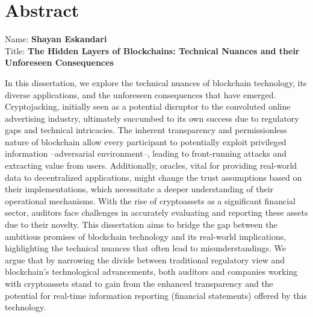 
\chapter*{Abstract}

Name: 	\tab \textbf{Shayan Eskandari} \\
Title: 	\tab \textbf{The Hidden Layers of Blockchains: Technical Nuances and their Unforeseen Consequences}

In this dissertation, we explore the technical nuances of blockchain technology, its diverse applications, and the unforeseen consequences that have emerged. Cryptojacking, initially seen as a potential disruptor to the convoluted online advertising industry, ultimately succumbed to its own success due to regulatory gaps and technical intricacies. The inherent transparency and permissionless nature of blockchain allow every participant to potentially exploit privileged information --adversarial environment--, leading to front-running attacks and extracting value from users. Additionally, oracles, vital for providing real-world data to decentralized applications, might change the trust assumptions based on their implementations, which necessitate a deeper understanding of their operational mechanisms. With the rise of cryptoassets as a significant financial sector, auditors face challenges in accurately evaluating and reporting these assets due to their novelty. This dissertation aims to bridge the gap between the ambitious promises of blockchain technology and its real-world implications, highlighting the technical nuances that often lead to misunderstandings. We argue that by narrowing the divide between traditional regulatory view and blockchain's technological advancements, both auditors and companies working with cryptoassets stand to gain from the enhanced transparency and the potential for real-time information reporting (\eg financial statements) offered by this technology.









